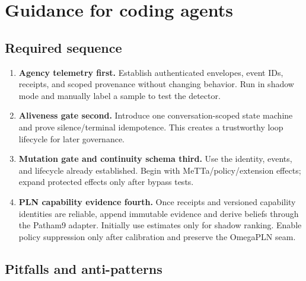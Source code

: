 \documentclass[11pt]{article}
\begin{document}
\section{Guidance for coding agents}

\subsection{Required sequence}

\begin{enumerate}
\item \textbf{Agency telemetry first.}  Establish authenticated envelopes,
event IDs, receipts, and scoped provenance without changing behavior.  Run in
shadow mode and manually label a sample to test the detector.
\item \textbf{Aliveness gate second.}  Introduce one conversation-scoped state
machine and prove silence/terminal idempotence.  This creates a trustworthy loop
lifecycle for later governance.
\item \textbf{Mutation gate and continuity schema third.}  Use the identity,
events, and lifecycle already established.  Begin with MeTTa/policy/extension
effects; expand protected effects only after bypass tests.
\item \textbf{PLN capability evidence fourth.}  Once receipts and versioned
capability identities are reliable, append immutable evidence and derive beliefs
through the Patham9 adapter.  Initially use estimates only for shadow ranking.
Enable policy suppression only after calibration and preserve the OmegaPLN seam.
\end{enumerate}

\subsection{Pitfalls and anti-patterns}
\end{document}
